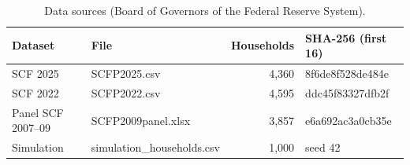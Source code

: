 \begin{table}[htbp]
\centering
\small
\caption{Data sources (Board of Governors of the Federal Reserve System).}
\label{tab:data}
\begin{tabular}{llrl}
\toprule
Dataset & File & Households & SHA-256 (first 16) \\
\midrule
SCF 2025 & SCFP2025.csv & 4,360 & 8f6de8f528de484e \\
SCF 2022 & SCFP2022.csv & 4,595 & ddc45f83327dfb2f \\
Panel SCF 2007--09 & SCFP2009panel.xlsx & 3,857 & e6a692ac3a0cb35e \\
Simulation & simulation\_households.csv & 1,000 & seed 42 \\
\bottomrule
\end{tabular}
\end{table}
